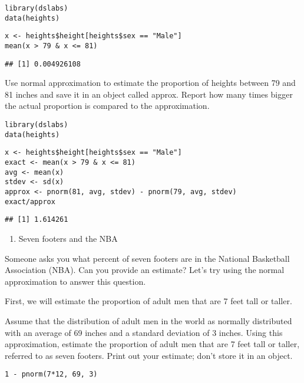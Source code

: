 \documentclass[]{article}
\providecommand{\tightlist}{%
  \setlength{\itemsep}{0pt}\setlength{\parskip}{0pt}}
\begin{document}
\begin{verbatim}
library(dslabs)  
data(heights)  
\end{verbatim}

\begin{verbatim}
x <- heights$height[heights$sex == "Male"]  
mean(x > 79 & x <= 81)  
\end{verbatim}

\begin{verbatim}
## [1] 0.004926108
\end{verbatim}

Use normal approximation to estimate the proportion of heights between
79 and 81 inches and save it in an object called approx. Report how many
times bigger the actual proportion is compared to the approximation.

\begin{verbatim}
library(dslabs)
data(heights)
\end{verbatim}

\begin{verbatim}
x <- heights$height[heights$sex == "Male"]
exact <- mean(x > 79 & x <= 81)
avg <- mean(x)
stdev <- sd(x)
approx <- pnorm(81, avg, stdev) - pnorm(79, avg, stdev)
exact/approx
\end{verbatim}

\begin{verbatim}
## [1] 1.614261
\end{verbatim}

\begin{enumerate}
\def\labelenumi{\arabic{enumi}.}
\setcounter{enumi}{3}
\tightlist
\item
  Seven footers and the NBA
\end{enumerate}

Someone asks you what percent of seven footers are in the National
Basketball Association (NBA). Can you provide an estimate? Let's try
using the normal approximation to answer this question.

First, we will estimate the proportion of adult men that are 7 feet tall
or taller.

Assume that the distribution of adult men in the world as normally
distributed with an average of 69 inches and a standard deviation of 3
inches. Using this approximation, estimate the proportion of adult men
that are 7 feet tall or taller, referred to as seven footers. Print out
your estimate; don't store it in an object.

\begin{verbatim}
1 - pnorm(7*12, 69, 3)
\end{verbatim}
\end{document}
